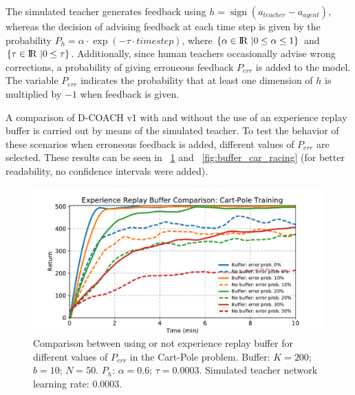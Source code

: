 The simulated teacher generates feedback using $h = \operatorname{sign}(a_{\mathit{teacher}} - a_{\mathit{agent}})$, whereas the decision of advising feedback at each time step is given by the probability $P_{h} = \alpha \cdot\exp(-\tau\cdot \mathit{timestep})$, where $\{\alpha \in {\rm I\!R}\ | 0 \le \alpha \le 1\}$ and $\{\tau \in {\rm I\!R}\ | 0 \le \tau\}$. Additionally, since human teachers occasionally advise wrong corrections, a probability of giving erroneous feedback $P_{\mathit{err}}$ is added to the model. The variable $P_{\mathit{err}}$ indicates the probability that at least one dimension of $h$ is multiplied by $-1$ when feedback is given.

A comparison of D-COACH v1 with and without the use of an experience replay buffer is carried out by means of the simulated teacher. To test the behavior of these scenarios when erroneous feedback is added, different values of $P_{\mathit{err}}$ are selected. These results can be seen in \figurename~{\ref{fig:buffer_cart_pole}} and \figurename~{\ref{fig:buffer_car_racing}} (for better readability, no confidence intervals were added).

\begin{figure}[t]
    \centering
    \includegraphics[width=0.9\linewidth]{imagenes/cap3/buffer_cart_pole.pdf}
    \caption{Comparison between using or not experience replay buffer for different values of $P_\mathit{err}$ in the Cart-Pole problem. Buffer: $K = 200$; $b = 10$; $N = 50$. $P_{h}$: $\alpha = 0.6$; $\tau = 0.0003$. Simulated teacher network learning rate: $0.0003$.}
    \label{fig:buffer_cart_pole}
\end{figure}

